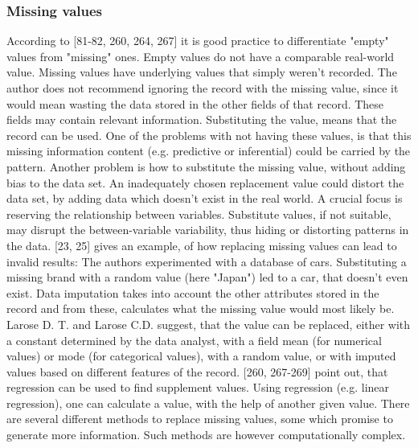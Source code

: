 


\subsubsection{Missing values}
According to \textcite{dataPreparationForDataMining}[81-82, 260, 264, 267] it is good practice to differentiate "empty" values from "missing" ones. Empty values do not have a comparable real-world value. Missing values have underlying values that simply weren't recorded. The author does not recommend ignoring the record with the missing value, since it would mean wasting the data stored in the other fields of that record. These fields may contain relevant information. Substituting the value, means that the record can be used. One of the problems with not having these values, is that this missing information content (e.g. predictive or inferential) could be carried by the pattern. Another problem is how to substitute the missing value, without adding bias to the data set. An inadequately chosen replacement value could distort the data set, by adding data which doesn't exist in the real world. A crucial focus is reserving the relationship between variables.  Substitute values, if not suitable, may disrupt the between-variable variability, thus hiding or distorting patterns in the data. 
\textcite{DataMiningAndPredictiveAnalytics}[23, 25] gives an example, of how replacing missing values can lead to invalid results: The authors experimented with a database of cars. Substituting a missing brand with a random value (here "Japan") led to a car, that doesn't even exist. Data imputation takes into account the other attributes stored in the record and from these, calculates what the missing value would most likely be. Larose D. T. and Larose C.D. suggest, that the value can be replaced, either with a constant determined by the data analyst, with a field mean (for numerical values) or mode (for categorical values), with a random value, or with imputed values based on different features of the record.  
\textcite{dataPreparationForDataMining}[260, 267-269] point out, that regression can be used to find supplement values. Using regression (e.g. linear regression), one can calculate a value, with the help of another given value. There are several different methods to replace missing values, some which promise to generate more information. Such methods are however computationally complex.  


